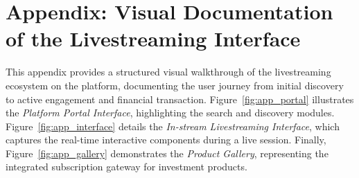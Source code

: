 \section{Appendix: Visual Documentation of the Livestreaming Interface}\label{app:app:visual_interface_docs}

This appendix provides a structured visual walkthrough of the livestreaming ecosystem on the platform, documenting the user journey from initial discovery to active engagement and financial transaction. 
Figure~\ref{fig:app_portal} illustrates the \textit{Platform Portal Interface}, highlighting the search and discovery modules. 
Figure~\ref{fig:app_interface} details the \textit{In-stream Livestreaming Interface}, which captures the real-time interactive components during a live session. 
Finally, Figure~\ref{fig:app_gallery} demonstrates the \textit{Product Gallery}, representing the integrated subscription gateway for investment products.

\newlength{\appheight}
\setlength{\appheight}{0.75\textheight}
\newcommand{\screenshotdir}{figures/pictures/screenshots/compressed}

